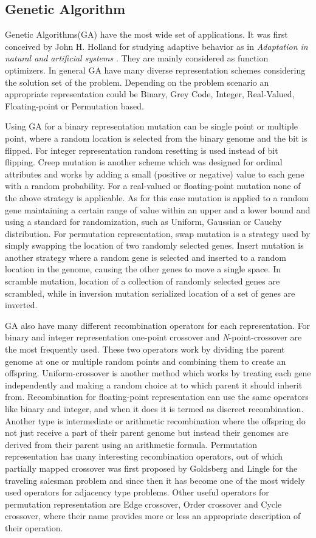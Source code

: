 \subsection{Genetic Algorithm}
Genetic Algorithms(GA) have the most wide set of applications. It was first conceived by John H. Holland for studying adaptive behavior as in \textit{Adaptation in natural and artificial systems} \cite{holland1975}. They are mainly considered as function optimizers. In general GA have many diverse representation schemes considering the solution set of the problem. Depending on the problem scenario an appropriate representation could be Binary, Grey Code, Integer, Real-Valued, Floating-point or Permutation based. 

Using GA for a binary representation mutation can be single point or multiple point, where a random location is selected from the binary genome and the bit is flipped. For integer representation random resetting is used instead of bit flipping. Creep mutation is another scheme which was designed for ordinal attributes and works by adding a small (positive or negative) value to each gene with a random probability. For a real-valued or floating-point mutation none of the above strategy is applicable. As for this case mutation is applied to a random gene maintaining a certain range of value within an upper and a lower bound and using a standard for randomization, such as Uniform, Gaussian or Cauchy distribution. For permutation representation, swap mutation is a strategy used by simply swapping the location of two randomly selected genes. Insert mutation is another strategy where a random gene is selected and inserted to a random location in the genome, causing the other genes to move a single space. In scramble mutation, location of a collection of randomly selected genes are scrambled, while in inversion mutation serialized location of a set of genes are inverted. 

GA also have many different recombination operators for each representation. For binary and integer representation one-point crossover and \textit{N}-point-crossover are the most frequently used. These two operators work by dividing the parent genome at one or multiple random points and combining them to create an offspring. Uniform-crossover \cite{sywerda1989} is another method which works by treating each gene independently and making a random choice at to which parent it should inherit from. Recombination for floating-point representation can use the same operators like binary and integer, and when it does it is termed as discreet recombination. Another type is intermediate or arithmetic recombination where the offspring do not just receive a part of their parent genome but instead their genomes are derived from their parent using an arithmetic formula. Permutation representation has many interesting recombination operators, out of which partially mapped crossover was first proposed by Goldsberg and Lingle \cite{goldberg1985} for the traveling salesman problem and since then it has become one of the most widely used operators for adjacency type problems. Other useful operators for permutation representation are Edge crossover, Order crossover and Cycle crossover, where their name provides more or less an appropriate description of their operation.

